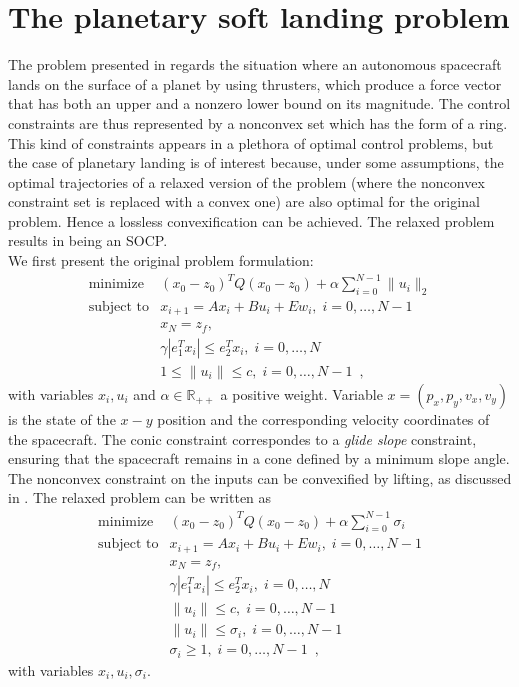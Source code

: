 \documentclass[openany]{now}
\newcommand{\reals}{{\mathbb R}}
\begin{document}
\section{The planetary soft landing problem}
The problem presented in \cite{planetary_landing} regards the situation where an autonomous spacecraft lands on the surface of a planet by using thrusters, which produce a force vector that has both an upper and a nonzero lower bound on its magnitude. The control constraints are thus represented by a nonconvex set which has the form of a ring. This kind of constraints appears in a plethora of optimal control problems, but the case of planetary landing is of interest because, under some assumptions, the optimal trajectories of a relaxed version of the problem (where the nonconvex constraint set is replaced with a convex one) are also optimal for the original problem. Hence a lossless convexification can be achieved. The relaxed problem results in being an SOCP. \\

We first present the original problem formulation:
\begin{equation}   \label{eq:original_nonconvex}
  \begin{array}{ll}
        \mbox{minimize} & (x_0-z_0)^TQ(x_0-z_0) + \alpha\sum_{i=0}^{N-1} \|u_i\|_2  \\
    \mbox{subject to} & x_{i+1} = Ax_i + Bu_i + Ew_i, \; i = 0,\ldots,N-1 \\
    \quad & x_N = z_f, \\
  \quad & \gamma |e_1^Tx_i| \le e_2^Tx_i, \; i = 0,\ldots,N \\
  \quad & 1 \le \|u_i\| \le c, \; i = 0,\ldots,N-1\enspace,
  \end{array}
\end{equation}
with variables $x_i,u_i$ and $\alpha\in\reals_{++}$ a positive weight. Variable $x=(p_x,p_y,v_x,v_y)$ is the state of the $x-y$ position and the corresponding velocity coordinates of the spacecraft. The conic constraint correspondes to a \emph{glide slope} constraint, ensuring that the spacecraft remains in a cone defined by a minimum slope angle. The nonconvex constraint on the inputs can be convexified by lifting, as discussed in \cite[Section~3]{planetary_landing}. The relaxed problem can be written as
\begin{equation}   \label{eq:socp}
  \begin{array}{ll}
    \mbox{minimize} & (x_0-z_0)^TQ(x_0-z_0) + \alpha\sum_{i=0}^{N-1} \sigma_i  \\
    \mbox{subject to} & x_{i+1} = Ax_i + Bu_i + Ew_i, \; i = 0,\ldots,N-1 \\
    \quad & x_N = z_f, \\
  \quad & \gamma |e_1^Tx_i| \le e_2^Tx_i, \; i = 0,\ldots,N \\
  \quad & \|u_i\| \le c, \; i = 0,\ldots,N-1 \\
  \quad & \|u_i\| \le \sigma_i, \; i = 0,\ldots,N-1 \\
  \quad & \sigma_i \ge 1, \; i = 0,\ldots,N-1\enspace,
  \end{array}
\end{equation}
with variables $x_i,u_i,\sigma_i$. \\
\end{document}
